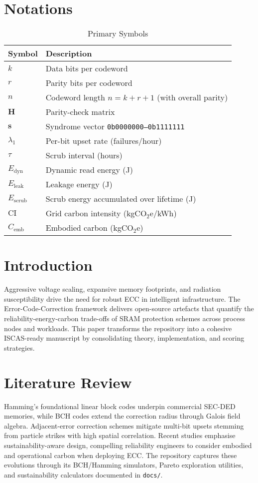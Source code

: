 \documentclass[conference]{IEEEtran}
\begin{document}
\section*{Notations}
\begin{table}[!t]
    \centering
    \caption{Primary Symbols}
    \begin{tabular}{@{}ll@{}}
        \toprule
        Symbol & Description \\
        \midrule
        $k$ & Data bits per codeword \\
        $r$ & Parity bits per codeword \\
        $n$ & Codeword length $n=k+r+1$ (with overall parity) \\
        $\mathbf{H}$ & Parity-check matrix \\
        $\mathbf{s}$ & Syndrome vector \texttt{0b0000000--0b1111111} \\
        $\lambda_{1}$ & Per-bit upset rate (failures/hour) \\
        $\tau$ & Scrub interval (hours) \\
        $E_{\text{dyn}}$ & Dynamic read energy (J) \\
        $E_{\text{leak}}$ & Leakage energy (J) \\
        $E_{\text{scrub}}$ & Scrub energy accumulated over lifetime (J) \\
        $\text{CI}$ & Grid carbon intensity (kgCO$_2$e/kWh) \\
        $C_{\text{emb}}$ & Embodied carbon (kgCO$_2$e) \\
        \bottomrule
    \end{tabular}
\end{table}
\section{Introduction}
Aggressive voltage scaling, expansive memory footprints, and radiation susceptibility drive the need for robust ECC in intelligent infrastructure.
The Error-Code-Correction framework delivers open-source artefacts that quantify the reliability-energy-carbon trade-offs of SRAM protection schemes across process nodes and workloads.
This paper transforms the repository into a cohesive ISCAS-ready manuscript by consolidating theory, implementation, and scoring strategies.
\section{Literature Review}
Hamming's foundational linear block codes underpin commercial SEC-DED memories, while BCH codes extend the correction radius through Galois field algebra.
Adjacent-error correction schemes mitigate multi-bit upsets stemming from particle strikes with high spatial correlation.
Recent studies emphasise sustainability-aware design, compelling reliability engineers to consider embodied and operational carbon when deploying ECC.
The repository captures these evolutions through its BCH/Hamming simulators, Pareto exploration utilities, and sustainability calculators documented in \texttt{docs/}.
\end{document}
